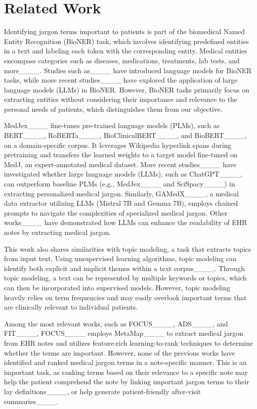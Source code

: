 \section{Related Work}
Identifying jargon terms important to patients is part of the biomedical Named Entity Recognition (BioNER) task, which involves identifying predefined entities in a text and labeling each token with the corresponding entity.
Medical entities encompass categories such as diseases, medications, treatments, lab tests, and more____.
Studies such as____ have introduced language models for BioNER tasks, while more recent studies____ have explored the application of large language models (LLMs) in BioNER.
However, BioNER tasks primarily focus on extracting entities without considering their importance and relevance to the personal needs of patients, which distinguishes them from our objective.

MedJex____ fine-tunes pre-trained language models (PLMs), such as BERT____, RoBERTa____, BioClinicalBERT____, and BioBERT____, on a domain-specific corpus.
It leverages Wikipedia hyperlink spans during pretraining and transfers the learned weights to a target model fine-tuned on MedJ, an expert-annotated medical dataset.
More recent studies____ have investigated whether large language models (LLMs), such as ChatGPT____, can outperform baseline PLMs (e.g., MedJex____ and SciSpacy____) in extracting personalized medical jargon.
Similarly, GAMedX____, a medical data extractor utilizing LLMs (Mistral 7B and Gemma 7B), employs chained prompts to navigate the complexities of specialized medical jargon.
Other works____ have demonstrated how LLMs can enhance the readability of EHR notes by extracting medical jargon.


This work also shares similarities with topic modeling, a task that extracts topics from input text.
Using unsupervised learning algorithms, topic modeling can identify both explicit and implicit themes within a text corpus____.
Through topic modeling, a text can be represented by multiple keywords or topics, which can then be incorporated into supervised models.
However, topic modeling heavily relies on term frequencies and may easily overlook important terms that are clinically relevant to individual patients.

Among the most relevant works, such as FOCUS____, ADS____, and FIT____,
FOCUS____ employs MetaMap____ to extract medical jargon from EHR notes and utilizes feature-rich learning-to-rank techniques to determine whether the terms are important.
However, none of the previous works have identified and ranked medical jargon terms in a note-specific manner.
This is an important task, as ranking terms based on their relevance to a specific note may help the patient comprehend the note by linking important jargon terms to their lay definitions____, or help 
generate patient-friendly after-visit summaries____.